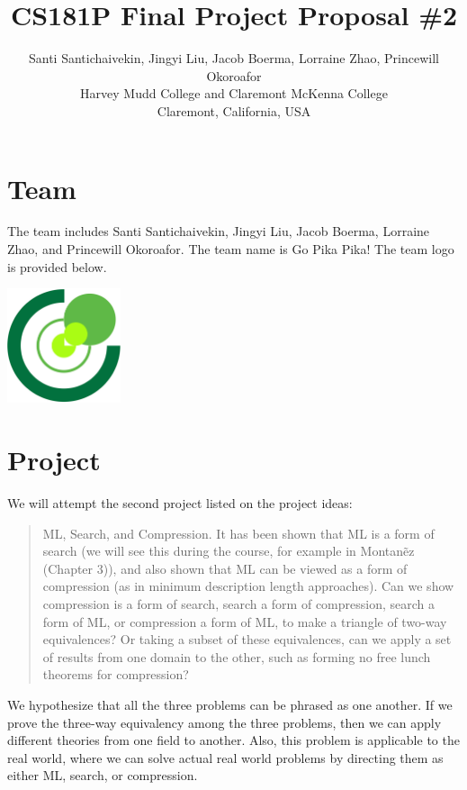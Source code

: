 \documentclass[12pt]{article}
\begin{document}
\title{CS181P Final Project Proposal \#2}

\author{
Santi Santichaivekin, Jingyi Liu, Jacob Boerma, Lorraine Zhao, Princewill Okoroafor\\
Harvey Mudd College and Claremont McKenna College\\
Claremont, California, USA\\
}

\maketitle

\section{Team}
The team includes Santi Santichaivekin,
Jingyi Liu,
Jacob Boerma,
Lorraine Zhao, and 
Princewill Okoroafor.
The team name is Go Pika Pika!
The team logo is provided below.

\includegraphics[width=0.25\textwidth]{../Logo/logo1.jpg}

\section{Project}

We will attempt the second project listed on the project ideas:
\begin{quote}
ML, Search, and Compression. It has been shown that ML is a form of search (we will see this during the course, for example in Montan\~ez (Chapter 3)), and also shown that ML can be viewed as a form of compression (as in minimum description length approaches). Can we show compression is a form of search, search a form of compression, search a form of ML, or compression a form of ML, to make a triangle of two-way equivalences? Or taking a subset of these equivalences, can we apply a set of results from one domain to the other, such as forming no free lunch theorems for compression?
\end{quote}
We hypothesize that all the three problems can be phrased as one another. If we prove the three-way equivalency among the three problems, then we can apply different theories from one field to another.
Also, this problem is applicable to the real world, where we can solve actual real world problems by directing them as either ML, search, or compression. 
\end{document}

